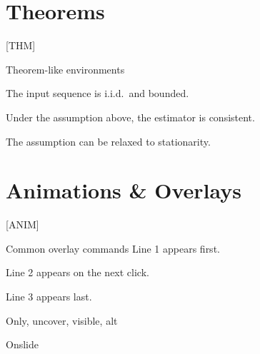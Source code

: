 \documentclass[aspectratio=169]{beamer}
\begin{document}
\section{Theorems}  [THM]
\begin{frame}{Theorem-like environments}
    \begin{assumption}
        The input sequence is i.i.d.\ and bounded.
    \end{assumption}

    \begin{proposition}
        Under the assumption above, the estimator is consistent.
    \end{proposition}

    \begin{remark}
        The assumption can be relaxed to stationarity.
    \end{remark}
\end{frame}

\section{Animations \& Overlays}  [ANIM]
\begin{frame}{Common overlay commands}
    \pause
    Line 1 appears first.

    \pause
    Line 2 appears on the next click.

    \pause
    Line 3 appears last.
\end{frame}

\begin{frame}{Only, uncover, visible, alt}

    \medskip

    \medskip

    \medskip
\end{frame}

\begin{frame}{Onslide}
\end{frame}
\end{document}
